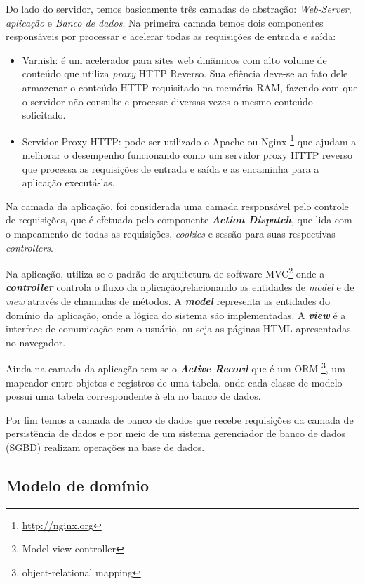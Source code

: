 Do lado do servidor, temos basicamente três camadas de abstração: \textit{Web-Server}, \textit{aplicação} e \textit{Banco de dados}. Na primeira camada temos dois componentes responsáveis por processar e acelerar todas as requisições de entrada e saída:

\begin{itemize}
\item Varnish: é um acelerador para sites web dinâmicos com alto volume de conteúdo que utiliza \textit{proxy} HTTP Reverso. Sua efiência deve-se ao fato dele armazenar o conteúdo HTTP requisitado na memória RAM, fazendo com que o servidor não consulte e processe diversas vezes o mesmo conteúdo solicitado.
\item Servidor Proxy HTTP: pode ser utilizado o Apache ou Nginx \footnote{\url{http://nginx.org}} que ajudam a melhorar o desempenho funcionando como um servidor proxy HTTP reverso que processa as requisições de entrada e saída e as encaminha para a aplicação executá-las.
\end{itemize}

Na camada da aplicação, foi considerada uma camada responsável pelo controle de requisições, que é efetuada pelo componente \textbf{\textit{Action Dispatch}}, que lida com o mapeamento de todas as requisições, \textit{cookies} e sessão para suas respectivas \textit{controllers}.

Na aplicação, utiliza-se o padrão de arquitetura de software MVC\footnote{Model-view-controller} onde a \textbf{\textit{controller}} controla o fluxo da aplicação,relacionando as entidades de \textit{model} e de \textit{view} através de chamadas de métodos. A \textbf{\textit{model}} representa as entidades do domínio da aplicação, onde a lógica do sistema são implementadas. A \textbf{\textit{view}} é a interface de comunicação com o usuário, ou seja as páginas HTML apresentadas no navegador.

Ainda na camada da aplicação tem-se o \textbf{\textit{Active Record}} que é um ORM \footnote{object-relational mapping}, um mapeador entre objetos e registros de uma tabela, onde cada classe de modelo possui uma tabela correspondente à ela no banco de dados.

Por fim temos a camada de banco de dados que recebe requisições da camada de persistência de dados e por meio de um sistema gerenciador de banco de dados (SGBD) realizam operações na base de dados.

\subsection{Modelo de domínio}

